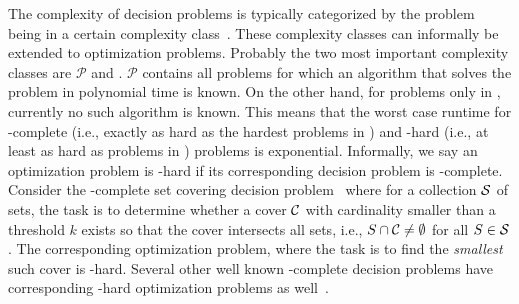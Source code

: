 The complexity of decision problems is typically categorized by the problem being in a certain complexity class~\autocite{AroraBarak2009-complexity}.
These complexity classes can informally be extended to optimization problems.
Probably the two most important complexity classes are $\mathcal{P}$ and \NP.
$\mathcal{P}$ contains all problems for which an algorithm that solves the problem in polynomial time is known.
On the other hand, for problems only in \NP, currently no such algorithm is known.
This means that the worst case runtime for \NP-complete (i.e., exactly as hard as the hardest problems in \NP) and \NP-hard (i.e., at least as hard as problems in \NP) problems is exponential.
Informally, we say an optimization problem is \NP-hard if its corresponding decision problem is \NP-complete.
Consider the \NP-complete set covering decision problem~\autocite{DBLP:conf/coco/Karp72} where for a collection $\mathcal{S}$ of sets, the task is to determine whether a cover $\mathcal{C}$ with cardinality smaller than a threshold $k$ exists so that the cover intersects all sets, i.e., $S \cap \mathcal{C} \neq \emptyset$ for all $S\in\mathcal{S}$.
The corresponding optimization problem, where the task is to find the \emph{smallest} such cover is \NP-hard.
Several other well known \NP-complete decision problems have corresponding \NP-hard optimization problems as well~\autocite{KorteVygen2018-15}.

